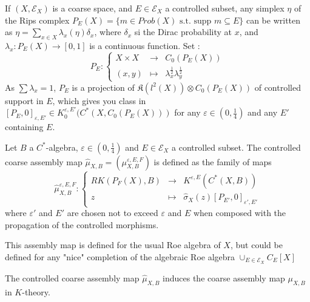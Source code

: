 If $(X,\mathcal E_X)$ is a coarse space, and $E\in\mathcal E_X$ a controlled subset, any simplex $\eta$ of the Rips complex $P_E(X) = \{m \in Prob(X)\text{ s.t. supp }m \subseteq E\}$ can be written as $\eta = \sum_{x\in X} \lambda_x(\eta) \delta_x$, where $\delta_x$ si the Dirac probability at $x$, and $\lambda_x : P_E(X)\rightarrow [0,1]$ is a continuous function. Set :
\[ P_E : \left\{\begin{array}{rcl} X \times X & \rightarrow & C_0(P_E(X))\\  (x,y) & \mapsto & \lambda_x^{\frac{1}{2}}\lambda_y^{\frac{1}{2}}\end{array}\right. \]  
As $\sum \lambda_x =1$, $P_E$ is a projection of $\mathfrak K(l^2(X)) \otimes C_0(P_E(X))$ of controlled support in $E$, which gives you class in $[P_E,0]_{\varepsilon, E'}\in K_0^{\varepsilon, E'} (C^*(X,C_0(P_E(X)))$ for any $\varepsilon\in (0,\frac{1}{4})$ and any $E'$ containing $E$.\\

\begin{definition}
Let $B$ a $C^*$-algebra, $\varepsilon\in (0,\frac{1}{4})$ and $E\in\mathcal E_X$ a controlled subset. The controlled coarse assembly map $\hat\mu_{X,B}=(\mu_{X,B}^{\varepsilon,E,F})$ is defined as the family of maps
\[\hat\mu_{X,B}^{\varepsilon, E,F} :\left\{\begin{array}{rcl} RK(P_F(X),B) & \rightarrow & K^{\varepsilon, E}(C^*(X,B)) \\
					z & \mapsto & \hat\sigma_X(z)[P_{E'},0]_{\varepsilon', E'}\end{array}\right.\]
where $\varepsilon'$ and $E'$ are chosen not to exceed $\varepsilon$ and $E$ when composed with the propagation of the controlled morphisms. 
\end{definition}

\begin{rk}
This assembly map is defined for the usual Roe algebra of $X$, but could be defined for any "nice" completion of the algebraic Roe algebra $\cup_{E\in \mathcal E_X} C_E[X]$
\end{rk}

\begin{rk}
The controlled coarse assembly map $\hat \mu_{X,B}$ induces the coarse assembly map $\mu_{X,B}$ in $K$-theory.
\end{rk}

 

































